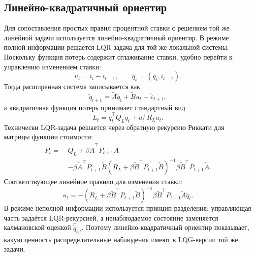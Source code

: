 \subsection{Линейно-квадратичный ориентир}

Для сопоставления простых правил процентной ставки с решением той же линейной задачи используется
линейно-квадратичный ориентир. В режиме
полной информации решается LQR-задача для той же локальной системы. Поскольку функция потерь
содержит сглаживание ставки, удобно перейти к управлению изменением ставки:
\[
u_t=i_t-i_{t-1},
\qquad
\widetilde q_t=(q_t,i_{t-1}).
\]
Тогда расширенная система записывается как
\[
\widetilde q_{t+1}
=
\widetilde A\widetilde q_t+\widetilde B u_t+\widetilde\varepsilon_{t+1},
\]
а квадратичная функция потерь принимает стандартный вид
\[
L_t
=
\widetilde q_t^\top Q_L\widetilde q_t+u_t^\top R_Lu_t.
\]
Технически LQR-задача решается через обратную рекурсию Риккати для матрицы функции стоимости:
\[
\begin{aligned}
P_t
=\;&
Q_L+\beta \widetilde A^\top P_{t+1}\widetilde A\\
&-
\beta \widetilde A^\top P_{t+1}\widetilde B
\left(
R_L+\beta \widetilde B^\top P_{t+1}\widetilde B
\right)^{-1}
\beta \widetilde B^\top P_{t+1}\widetilde A .
\end{aligned}
\]
Соответствующее линейное правило для изменения ставки:
\[
u_t
=
-
\left(
R_L+\beta \widetilde B^\top P_{t+1}\widetilde B
\right)^{-1}
\beta \widetilde B^\top P_{t+1}\widetilde A\widetilde q_t .
\]
В режиме неполной информации используется принцип разделения: управляющая часть задаётся
LQR-рекурсией, а ненаблюдаемое состояние заменяется калмановской оценкой
\(\widehat{\widetilde{q}}_{t|t}\). Поэтому линейно-квадратичный ориентир показывает, какую
ценность распределительные наблюдения имеют в LQG-версии той же задачи.
